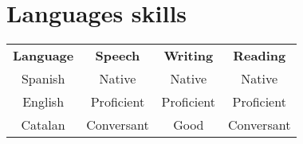 \documentclass[10pt]{report}
\begin{document}
\setcounter{page}{1}


\begin{minipage}{1\linewidth}
\end{minipage}



\hypertarget{languages-skills}{%
\section{Languages skills}\label{languages-skills}}

\begin{tabular}{ c c c c }
\textbf{Language} & \textbf{Speech} & \textbf{Writing} & \textbf{Reading} \\
Spanish & Native & Native & Native \\
English & Proficient & Proficient & Proficient \\
Catalan & Conversant & Good & Conversant
\end{tabular}

\nocite{*}
\printbibliography[title={Selected Publications},keyword=selected] %
\printbibliography[title={Publications}] %

%
\bigskip
\end{document}
